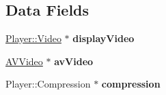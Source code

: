 \subsection*{Data Fields}
\begin{DoxyCompactItemize}
\item 
\hypertarget{classYuvVideo_aae91bd8f5549166d101288f760b0d6e2}{}\hyperlink{classPlayer_1_1Video}{Player\+::\+Video} $\ast$ {\bfseries display\+Video}\label{classYuvVideo_aae91bd8f5549166d101288f760b0d6e2}

\item 
\hypertarget{classYuvVideo_ab98f911d8298d4c66a7712e830aded78}{}\hyperlink{classAVVideo}{A\+V\+Video} $\ast$ {\bfseries av\+Video}\label{classYuvVideo_ab98f911d8298d4c66a7712e830aded78}

\item 
\hypertarget{classYuvVideo_add34d8721d8cc2646e12bfbafa28ee28}{}Player\+::\+Compression $\ast$ {\bfseries compression}\label{classYuvVideo_add34d8721d8cc2646e12bfbafa28ee28}

\end{DoxyCompactItemize}
